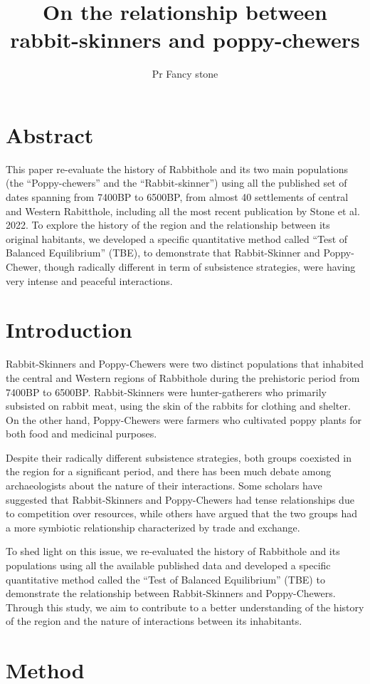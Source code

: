 \documentclass[10pt]{paper}
\title{ On the relationship between rabbit-skinners and poppy-chewers }
\author{Pr Fancy stone}
\begin{document}
\section*{Abstract}
This paper re-evaluate the history of Rabbithole and its two main populations (the ``Poppy-chewers'' and the ``Rabbit-skinner'') using all the published set of dates spanning from 7400BP to 6500BP, from almost 40 settlements of central and Western Rabitthole, including all the most recent publication by Stone et al. 2022. To explore the history of the region and the relationship between its original habitants, we developed a specific quantitative method called ``Test of Balanced Equilibrium'' (TBE), to demonstrate that Rabbit-Skinner and Poppy-Chewer, though radically different in term of subsistence strategies, were having very intense and peaceful interactions.

\section{Introduction}
Rabbit-Skinners and Poppy-Chewers were two distinct populations that inhabited the central and Western regions of Rabbithole during the prehistoric period from 7400BP to 6500BP. Rabbit-Skinners were hunter-gatherers who primarily subsisted on rabbit meat, using the skin of the rabbits for clothing and shelter. On the other hand, Poppy-Chewers were farmers who cultivated poppy plants for both food and medicinal purposes.

Despite their radically different subsistence strategies, both groups coexisted in the region for a significant period, and there has been much debate among archaeologists about the nature of their interactions. Some scholars have suggested that Rabbit-Skinners and Poppy-Chewers had tense relationships due to competition over resources, while others have argued that the two groups had a more symbiotic relationship characterized by trade and exchange.

To shed light on this issue, we re-evaluated the history of Rabbithole and its populations using all the available published data and developed a specific quantitative method called the ``Test of Balanced Equilibrium'' (TBE) to demonstrate the relationship between Rabbit-Skinners and Poppy-Chewers. Through this study, we aim to contribute to a better understanding of the history of the region and the nature of interactions between its inhabitants.
\section{Method}
\end{document}

